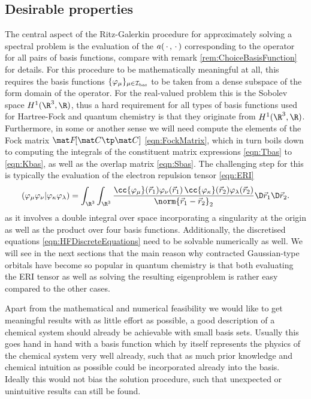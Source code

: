 \subsection{Desirable properties}
\label{sec:BasisDesiredProperties}
The central aspect of the Ritz-Galerkin procedure for
approximately solving a spectral problem
is the evaluation of the $a(\,\cdot\,,\,\cdot\,)$
corresponding to the operator for all pairs of basis functions,
compare with remark \vref{rem:ChoiceBasisFunction} for details.
For this procedure to be mathematically meaningful at all,
this requires the basis functions $\{\varphi_\mu\}_{\mu\in\mathcal{I}_\text{bas}}$
to be taken from a dense subspace of the form domain of the operator.
For the real-valued \HF problem this is the Sobolev space $H^1(\R^3, \R)$,
thus a hard requirement for all types of basis functions
used for Hartree-Fock and quantum chemistry is that
they originate from $H^1(\R^3, \R)$.
Furthermore, in some or another sense we will need compute the elements
of the Fock matrix $\matFfull$ \eqref{eqn:FockMatrix},
which in turn boils down to computing the integrals of the constituent
matrix expressions \eqref{eqn:Tbas} to \eqref{eqn:Kbas},
as well as the overlap matrix \eqref{eqn:Sbas}.
The challenging step for this is typically the evaluation
of the electron repulsion tensor \eqref{eqn:ERI}
\[
	\eriMu{\varphi_\mu \varphi_\nu}{\varphi_\kappa \varphi_\lambda}
		= \int_{\R^3} \int_{\R^3}
			\frac{\cc{\varphi_\mu}(\vec{r}_1) \varphi_\nu(\vec{r}_1)
				\,\cc{\varphi_\kappa}(\vec{r}_2) \varphi_\lambda(\vec{r}_2)}
			{\norm{\vec{r}_1 - \vec{r}_2}_2}
			\D \vec{r}_1 \D \vec{r}_2.
\]
as it involves a double integral over space
incorporating a singularity at the origin
as well as the product over four basis functions.
Additionally, the discretised \HF equations \eqref{eqn:HFDiscreteEquations}
need to be solvable numerically as well.
We will see in the next sections
that the main reason why contracted Gaussian-type orbitals
have become so popular in quantum chemistry
is that both evaluating the ERI tensor
as well as solving the resulting eigenproblem
is rather easy compared to the other cases.

Apart from the mathematical and numerical feasibility
we would like to get meaningful results with as little effort as possible,
\ie a good description of a chemical system should already be achievable
with small basis sets.
Usually this goes hand in hand with a basis function
which by itself represents the physics
of the chemical system very well already,
such that as much prior knowledge and chemical intuition as possible
could be incorporated already into the basis.
Ideally this would not bias the solution procedure,
such that unexpected or unintuitive results can still be found.

